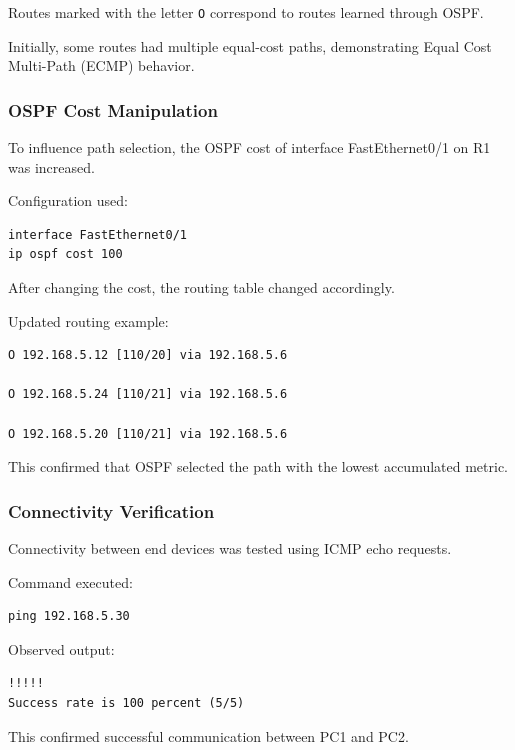 \documentclass[12pt]{article}
\begin{document}
Routes marked with the letter \texttt{O} correspond to routes learned through OSPF.

Initially, some routes had multiple equal-cost paths, demonstrating Equal Cost Multi-Path (ECMP) behavior.

\subsubsection{OSPF Cost Manipulation}

To influence path selection, the OSPF cost of interface FastEthernet0/1 on R1 was increased.

Configuration used:

\begin{lstlisting}
interface FastEthernet0/1
ip ospf cost 100
\end{lstlisting}

After changing the cost, the routing table changed accordingly.

Updated routing example:

\begin{lstlisting}
O 192.168.5.12 [110/20] via 192.168.5.6

O 192.168.5.24 [110/21] via 192.168.5.6

O 192.168.5.20 [110/21] via 192.168.5.6
\end{lstlisting}

This confirmed that OSPF selected the path with the lowest accumulated metric.

\subsubsection{Connectivity Verification}

Connectivity between end devices was tested using ICMP echo requests.

Command executed:

\begin{lstlisting}
ping 192.168.5.30
\end{lstlisting}

Observed output:

\begin{lstlisting}
!!!!!
Success rate is 100 percent (5/5)
\end{lstlisting}

This confirmed successful communication between PC1 and PC2.
\end{document}
